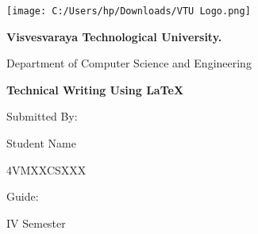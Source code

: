 \documentclass{article}
\begin{document}
	\begin{center}
		\centering
		\texttt{[image: C:/Users/hp/Downloads/VTU Logo.png]}\par
		{\Large\textbf{Visvesvaraya Technological University.}\par}
		\vspace{1cm}
		{\Large{Department of Computer Science and Engineering}\par}
		\vspace{2cm}
		{\Huge\textbf{Technical Writing Using LaTeX}\par}
		\vspace{2cm}
		{\Large{Submitted By:}\par}
		{\large{Student Name}\par}
		{\large{4VMXXCSXXX}\par}
		\vspace{2cm}
		{\Large{Guide:}\par}
		{\large{}\par}
		\vfill
		{\large{IV Semester}\par}
	\end{center}
\end{document}

